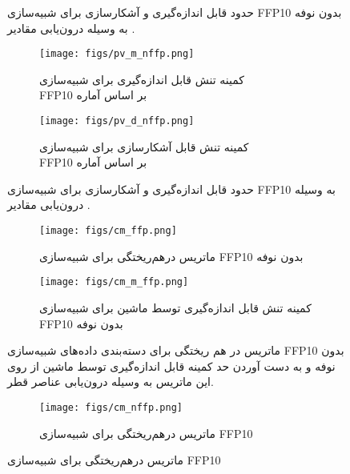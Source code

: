 \begin{itemize}
\begin{figure}[H]
		\caption{حدود قابل اندازه‌گیری و آشکارسازی برای شبیه‌سازی 
			FFP10 
			بدون نوفه به وسیله درون‌یابی مقادیر 
			.}
		\label{fig:ffp_cm}
	\end{figure}
	\begin{figure}[H]
		\centering
		\begin{subfigure}{0.5\textwidth}
			\centering
			\texttt{[image: figs/pv\_m\_nffp.png]}
			\caption{   کمینه تنش قابل اندازه‌گیری برای شبیه‌سازی 
				\\	FFP10 
				بر اساس آماره 
				 }
		\end{subfigure}%
		\begin{subfigure}{0.5\textwidth}
			\centering
			\texttt{[image: figs/pv\_d\_nffp.png]}
			\caption{  کمینه تنش قابل آشکارسازی برای شبیه‌سازی 
				\\	FFP10 
				بر اساس آماره 
				 }
		\end{subfigure}
		
		\caption{حدود قابل اندازه‌گیری و آشکارسازی برای شبیه‌سازی 
			FFP10 
			به وسیله درون‌یابی مقادیر 
			.}
		\label{fig:nffp_cm}
	\end{figure}
	\begin{figure}[H]
		\centering
		\begin{subfigure}{\textwidth}
			\centering
			\texttt{[image: figs/cm\_ffp.png]}
			\caption{  ماتریس درهم‌ریختگی برای شبیه‌سازی 
				FFP10 
				بدون نوفه }
		\end{subfigure}%
		
		\begin{subfigure}{0.5\linewidth}
			\centering
			\texttt{[image: figs/cm\_m\_ffp.png]}
			\caption{  کمینه تنش قابل اندازه‌گیری توسط ماشین برای شبیه‌سازی 
				FFP10 
				بدون نوفه }
		\end{subfigure}
		
		\caption{ماتریس در هم ریختگی برای دسته‌بندی داده‌های شبیه‌سازی
			FFP10 
			بدون نوفه و به دست آوردن حد کمینه قابل اندازه‌گیری توسط ماشین از روی این ماتریس به وسیله درون‌یابی عناصر قطر.}
		\label{fig:ffp_pv}
	\end{figure}
	\begin{figure}[H]
		\centering
		\begin{subfigure}{\textwidth}
			\centering
			\texttt{[image: figs/cm\_nffp.png]}
			\caption{  ماتریس درهم‌ریختگی برای شبیه‌سازی 
				FFP10 
			}
		\end{subfigure}%
		

\end{figure}
\end{itemize}
